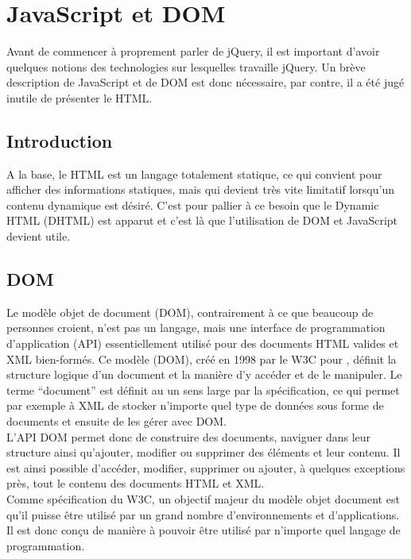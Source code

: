 \documentclass[10pt,a4paper,titlepage]{article}
\begin{document}
\newpage
\section{JavaScript et DOM}
Avant de commencer à proprement parler de jQuery, il est important d'avoir quelques notions des technologies sur lesquelles travaille jQuery. Un brève description de JavaScript et de DOM est donc nécessaire, par contre, il a été jugé inutile de présenter le HTML.

\subsection{Introduction}
A la base, le HTML est un langage totalement statique, ce qui convient pour afficher des informations statiques, mais qui devient très vite limitatif lorsqu'un contenu dynamique est désiré. C'est pour pallier à ce besoin que le Dynamic HTML (DHTML) est apparut et c'est là que l'utilisation de DOM et JavaScript devient utile.

\subsection{DOM}
Le modèle objet de document (DOM), contrairement à ce que beaucoup de personnes croient, n'est pas un langage, mais une interface de programmation d'application (API) essentiellement utilisé pour des documents HTML valides et XML bien-formés. Ce modèle (DOM), créé en 1998 par le W3C pour , définit la structure logique d'un document et la manière d'y accéder et de le manipuler. Le terme “document” est définit au un sens large par la spécification, ce qui permet par exemple à XML de stocker n'importe quel type de données sous forme de documents et ensuite de les gérer avec DOM.\\

L'API DOM permet donc de construire des documents, naviguer dans leur structure ainsi qu'ajouter, modifier ou supprimer des éléments et leur contenu. Il est ainsi possible d'accéder, modifier, supprimer ou ajouter, à quelques exceptions près, tout le contenu des documents HTML et XML.\\

Comme spécification du W3C, un objectif majeur du modèle objet document est qu'il puisse être utilisé par un grand nombre d'environnements et d'applications. Il est donc conçu de manière à pouvoir être utilisé par n'importe quel langage de programmation.\\
\end{document}
